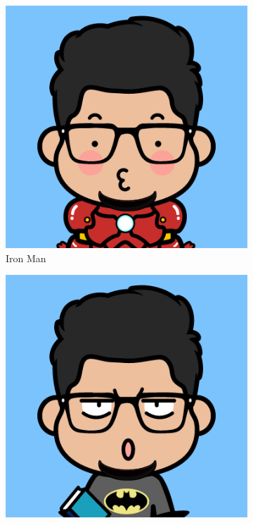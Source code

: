 \documentclass{article}
\begin{document}
    \begin{figure}[h!]
        \centering
        \begin{subfigure}[h!]{0.3\linewidth}
            \includegraphics[width=\linewidth]{B.png}
            \caption{Iron Man}
        \end{subfigure}
        \begin{subfigure}[h!]{0.3\linewidth}
            \includegraphics[width=\linewidth]{C.png}

\end{subfigure}
\end{figure}
\end{document}
